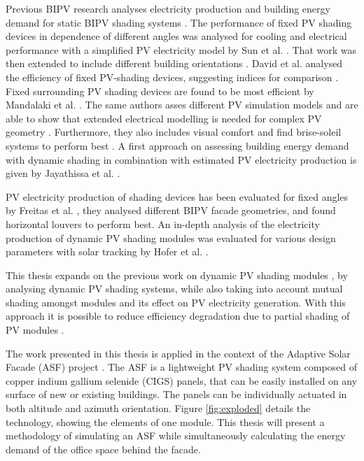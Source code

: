 	Previous BIPV research analyses electricity production and building energy demand for static BIPV shading systems \cite{sun2010, sun2012, David2011, mandalaki2012assessment, Mandalaki2014complexPV, mandalaki2014assessment, yoo2011available, jayathissa2015abs}. The performance of fixed PV shading devices in dependence of different angles was analysed for cooling and electrical performance with a simplified PV electricity model by Sun et al. \cite{sun2010}. That work was then extended to include different building orientations \cite{sun2012} . David et al. analysed the efficiency of fixed PV-shading devices, suggesting indices for comparison \cite{David2011}. Fixed surrounding PV shading devices are found to be most efficient by Mandalaki et al. \cite{mandalaki2012assessment}. The same authors asses different PV simulation models and are able to show that extended electrical modelling is needed for complex PV geometry \cite{Mandalaki2014complexPV}. Furthermore, they also includes visual comfort and find brise-soleil systems to perform best \cite{mandalaki2014assessment}. A first approach on assessing building energy demand with dynamic shading in combination with estimated PV electricity production is given by Jayathissa et al. \cite{jayathissa2015abs}. 

	PV electricity production of shading devices has been evaluated for fixed angles by Freitas et al. \cite{freitas2015maximizing}, they analysed different BIPV facade geometries, and found horizontal louvers to perform best. An in-depth analysis of the electricity production of dynamic PV shading modules was evaluated for various design parameters with solar tracking by Hofer et al. \cite{hofer2016}. 

	This thesis expands on the previous work on dynamic PV shading modules \cite{jayathissa2015abs, hofer2016}, by analysing dynamic PV shading systems, while also taking into account mutual shading amongst modules and its effect on PV electricity generation. With this approach it is possible to reduce efficiency degradation due to partial shading of PV modules \cite{hofer2016}.

	The work presented in this thesis is applied in the context of the Adaptive Solar Facade (ASF) project \cite{nagy2016}. The ASF is a lightweight PV shading system composed of copper indium gallium selenide (CIGS) panels, that can be easily installed on any surface of new or existing buildings. The panels can be individually actuated in both altitude and azimuth orientation. Figure \ref{fig:exploded} details the technology, showing the elements of one module. This thesis will present a methodology of simulating an ASF while simultaneously calculating the energy demand of the office space behind the facade.


